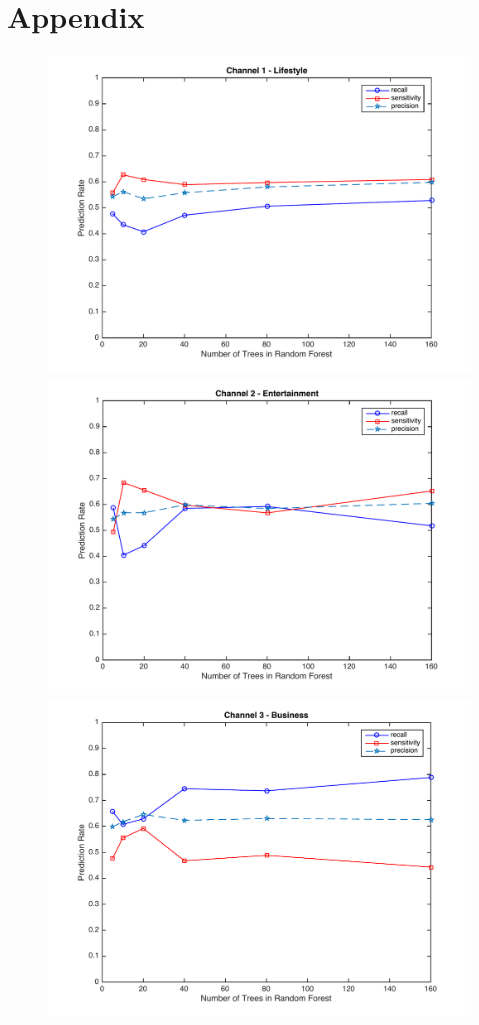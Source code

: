 \documentclass{article} %
\begin{document}
\section{Appendix}
\vskip 1.5cm
\begin{figure}[h!]
\centering
 \includegraphics[scale = 0.32]{channel_1.pdf}
 \includegraphics[scale = 0.32]{channel_2.pdf}
 \includegraphics[scale = 0.35]{channel_3.pdf}

\end{figure}
\end{document}
